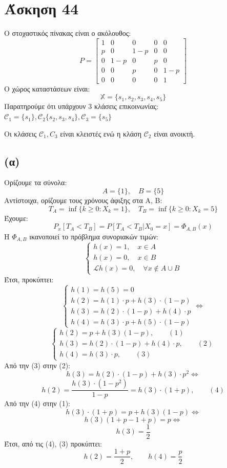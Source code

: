 \documentclass[a4paper,oneside, 11pt]{article}
\begin{document}
\section*{Άσκηση 44}
Ο στοχαστικός πίνακας είναι ο ακόλουθος:
$$
P = \begin{bmatrix}
1 & 0 & 0 & 0 & 0 \\
p & 0 & 1-p & 0 & 0 \\
0 & 1-p & 0 & p & 0 \\
0 & 0 & p & 0 & 1-p \\
0 & 0 & 0 & 0 & 1
\end{bmatrix}
$$
Ο χώρος καταστάσεων είναι:
$$
\mathbb X = \{ s_1, s_2, s_3, s_4, s_5 \}
$$
Παρατηρούμε ότι υπάρχουν 3 κλάσεις επικοινωνίας: $\mathcal C_1 = \{s_1\}, \mathcal C_2 \{ s_2, s_3, s_4\}, \mathcal C_3 = \{s_5\}$

Οι κλάσεις $\mathcal C_1, C_3$ είναι κλειστές ενώ η κλάση $\mathcal C_2$ είναι ανοικτή.

\subsection*{(α)}

Ορίζουμε τα σύνολα:
$$
A = \{1\}, \quad B = \{5\}
$$
Αντίστοιχα, ορίζουμε τους χρόνους άφιξης στα Α, Β:
$$
T_A = \inf\{k \geq 0: X_k = 1\}, \quad T_B = \inf\{k \geq 0: X_k = 5\}
$$
Έχουμε:
$$
P_x [T_A < T_B] = P[T_A < T_B | X_0 = x] = \Phi_{A, B}(x)
$$
Η $\Phi_{A,B}$ ικανοποιεί το πρόβλημα συνοριακών τιμών:
$$
\begin{cases}
h(x)= 1, \quad x\in A\\
h(x) = 0, \quad x \in B \\
\mathcal L h(x) = 0, \quad \forall x \not\in A \cup B
\end{cases}
$$
Έτσι, προκύπτει:
$$
\begin{cases}
h(1) = h(5) = 0\\
h(2) = h(1)\cdot p + h(3) \cdot (1-p) \\
h(3) = h(2)\cdot (1-p) + h(4)\cdot p \\
h(4) = h(3)\cdot p + h(5)\cdot (1-p)
\end{cases} \iff
$$
$$
\begin{cases}
h(2) = p + h(3) (1-p),\qquad (1) \\
h(3) = h(2)\cdot (1-p) + h(4)\cdot p,\qquad (2) \\
h(4) = h(3)\cdot p, \qquad (3)
\end{cases}
$$
Από την (3) στην (2):
$$
h(3) = h(2)\cdot (1-p) + h(3)\cdot p^2 \iff 
$$
$$
h(2) = \frac{h(3) \cdot (1-p^2)}{1-p} = h(3)\cdot (1+p), \qquad (4)
$$
Από την (4) στην (1):
$$
h(3)\cdot (1+p) = p + h(3)(1-p) \iff
$$
$$
h(3) (1 +p -1 + p) = p \iff
$$
$$
h(3) = \frac{1}{2}
$$
Έτσι, από τις (4), (3) προκύπτει:
$$
h(2) = \frac{1+p}{2}, \qquad h(4) = \frac{p}{2}
$$
\end{document}
